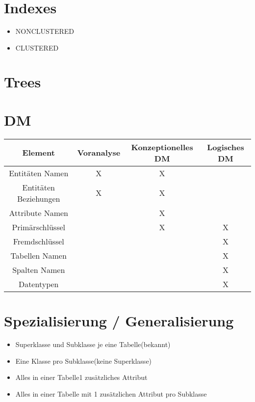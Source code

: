 \documentclass[a4paper,8pt]{article} %
\begin{document}
\begin{small}
\begin{minipage}{0.5\linewidth}
			\section{Indexes}
				\begin{itemize}
					\item NONCLUSTERED
					\item CLUSTERED
				\end{itemize}
			 
		\end{minipage}
	\section{Trees}
	\begin{minipage}{0.65 \linewidth}
		\section{DM}
			\begin{tabular}{c|c|c|c}
				Element					&Voranalyse	&Konzeptionelles DM	&Logisches DM\\\hline\hline
				Entitäten Namen			&X			&X					&\\\hline
				Entitäten Beziehungen	&X			&X					&\\\hline
				Attribute Namen			&			&X					&\\\hline
				Primärschlüssel			&			&X					&X\\\hline
				Fremdschlüssel			&			&					&X\\\hline
				Tabellen Namen			&			&					&X\\\hline
				Spalten Namen			&			&					&X\\\hline
				Datentypen				&			&					&X\\\hline
			\end{tabular}
	\end{minipage}
	\begin{minipage}{0.35 \linewidth}
		\section{Spezialisierung / Generalisierung}
			\begin{itemize}
				\item Superklasse und Subklasse je eine Tabelle(bekannt)
				\item Eine Klasse pro Subklasse(keine Superklasse)
				\item Alles in einer Tabelle1 zusätzliches Attribut
				\item Alles in einer Tabelle mit 1 zusätzlichen Attribut pro Subklasse
			\end{itemize}
	\end{minipage}

	\end{small}
\end{document}
